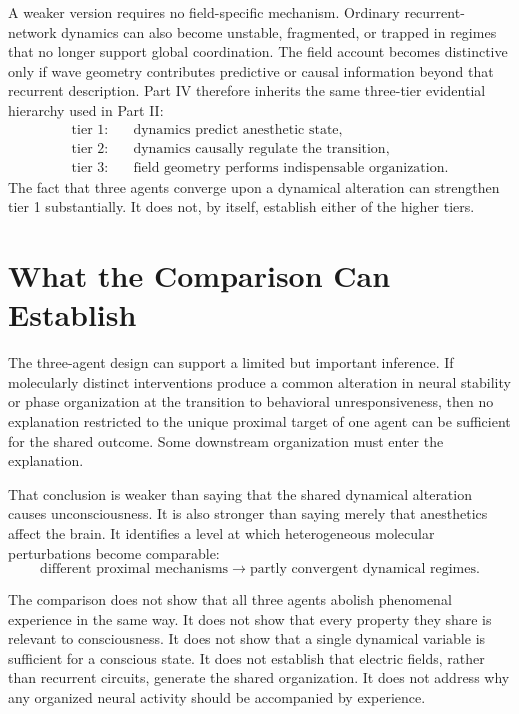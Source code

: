 \documentclass[11pt]{book}
\begin{document}
A weaker version requires no field-specific mechanism. Ordinary recurrent-network dynamics can also become unstable, fragmented, or trapped in regimes that no longer support global coordination. The field account becomes distinctive only if wave geometry contributes predictive or causal information beyond that recurrent description. Part IV therefore inherits the same three-tier evidential hierarchy used in Part II:
\[
\begin{aligned}
\text{tier 1:}\quad&
\text{dynamics predict anesthetic state},
\\
\text{tier 2:}\quad&
\text{dynamics causally regulate the transition},
\\
\text{tier 3:}\quad&
\text{field geometry performs indispensable organization}.
\end{aligned}
\]
The fact that three agents converge upon a dynamical alteration can strengthen tier 1 substantially. It does not, by itself, establish either of the higher tiers.

\section*{What the Comparison Can Establish}

The three-agent design can support a limited but important inference. If molecularly distinct interventions produce a common alteration in neural stability or phase organization at the transition to behavioral unresponsiveness, then no explanation restricted to the unique proximal target of one agent can be sufficient for the shared outcome. Some downstream organization must enter the explanation.

That conclusion is weaker than saying that the shared dynamical alteration causes unconsciousness. It is also stronger than saying merely that anesthetics affect the brain. It identifies a level at which heterogeneous molecular perturbations become comparable:
\[
\text{different proximal mechanisms}
\longrightarrow
\text{partly convergent dynamical regimes}.
\]

The comparison does not show that all three agents abolish phenomenal experience in the same way. It does not show that every property they share is relevant to consciousness. It does not show that a single dynamical variable is sufficient for a conscious state. It does not establish that electric fields, rather than recurrent circuits, generate the shared organization. It does not address why any organized neural activity should be accompanied by experience.
\end{document}
